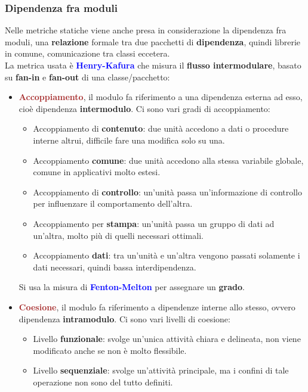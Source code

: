 \subsubsection{Dipendenza fra moduli}
Nelle metriche statiche viene anche presa in considerazione la dipendenza fra moduli, una \textbf{relazione} formale tra due pacchetti di \textbf{dipendenza}, quindi librerie in comune, comunicazione tra classi eccetera.\\
La metrica usata è \textbf{\textcolor{blue}{Henry-Kafura}} che misura il \textbf{flusso intermodulare}, basato su \textbf{fan-in} e \textbf{fan-out} di una classe/pacchetto:
\begin{itemize}
    \item \textbf{\textcolor{brown}{Accoppiamento}}, il modulo fa riferimento a una dipendenza esterna ad esso, cioè dipendenza \textbf{intermodulo}. Ci sono vari gradi di accoppiamento:
    \begin{itemize}
        \item Accoppiamento di \textbf{contenuto}: due unità accedono a dati o procedure interne altrui, difficile fare una modifica solo su una.
        \item Accoppiamento \textbf{comune}: due unità accedono alla stessa variabile globale, comune in applicativi molto estesi.
        \item Accoppiamento di \textbf{controllo}: un'unità passa un'informazione di controllo per influenzare il comportamento dell'altra.
        \item Accoppiamento per \textbf{stampa}: un'unità passa un gruppo di dati ad un'altra, molto più di quelli necessari ottimali.
        \item Accoppiamento \textbf{dati}: tra un'unità e un'altra vengono passati solamente i dati necessari, quindi bassa interdipendenza.
    \end{itemize}
    Si usa la misura di \textbf{\textcolor{blue}{Fenton-Melton}} per assegnare un \textbf{grado}.
    \item \textbf{\textcolor{brown}{Coesione}}, il modulo fa riferimento a dipendenze interne allo stesso, ovvero dipendenza \textbf{intramodulo}. Ci sono vari livelli di coesione:
    \begin{itemize}
        \item Livello \textbf{funzionale}: svolge un'unica attività chiara e delineata, non viene modificato anche se non è molto flessibile.
        \item Livello \textbf{sequenziale}: svolge un'attività principale, ma i confini di tale operazione non sono del tutto definiti.

\end{itemize}
\end{itemize}
